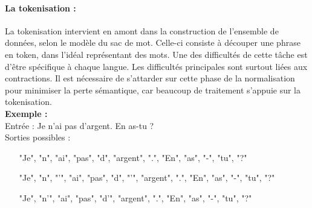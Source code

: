                 \paragraph{La tokenisation :}
                    La tokenisation intervient en amont dans la construction de l'ensemble de données, selon le modèle du sac de mot. Celle-ci consiste à découper une phrase en token, dans l'idéal représentant des mots. Une des difficultés de cette tâche est d'être spécifique à chaque langue. Les difficultés principales sont surtout liées aux contractions. Il est nécessaire de s'attarder sur cette phase de la normalisation pour minimiser la perte sémantique, car beaucoup de traitement s'appuie sur la tokenisation.\\
                    \textbf{Exemple :}\\
                    Entrée : \og Je n'ai pas d'argent. En as-tu ? \fg\\
                    Sorties possibles :
                    \begin{itemize}
                        \item ["Je", "n", "ai", "pas", "d", "argent", ".", "En", "as", "-", "tu", "?"]
                        \item ["Je", "n", "'", "ai", "pas", "d", "'", "argent", ".", "En", "as", "-", "tu", "?"]
                        \item ["Je", "n'", "ai", "pas", "d'", "argent", ".", "En", "as", "-", "tu", "?"]
                    \end{itemize}

